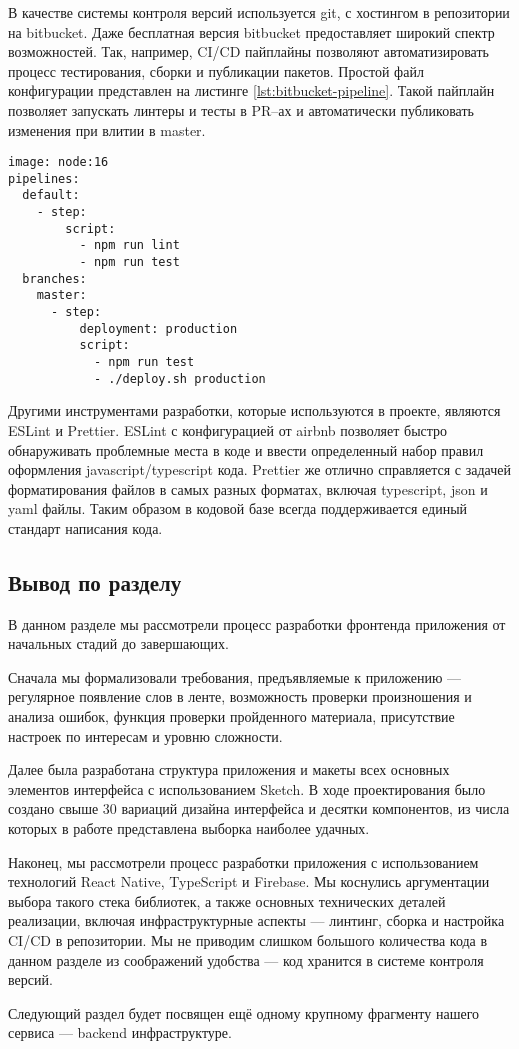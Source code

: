 В качестве системы контроля версий используется git, с хостингом в репозитории на bitbucket. Даже бесплатная версия bitbucket предоставляет широкий спектр возможностей. Так, например, CI/CD пайплайны позволяют автоматизировать процесс тестирования, сборки и публикации пакетов. Простой файл конфигурации представлен на листинге \ref{lst:bitbucket-pipeline}. Такой пайплайн позволяет запускать линтеры и тесты в PR--ах и автоматически публиковать изменения при влитии в master.

\begin{lstlisting}[basicstyle=\fontsize{11}{11}\selectfont,tabsize=4,breaklines=true,caption={Пример конфигурации сборочного конвейера bitbucket.},captionpos=b,label={lst:bitbucket-pipeline}]
image: node:16
pipelines:
  default:
    - step:
        script:
          - npm run lint
          - npm run test
  branches:
    master:
      - step:
          deployment: production
          script:
            - npm run test
            - ./deploy.sh production
\end{lstlisting}

Другими инструментами разработки, которые используются в проекте, являются ESLint и Prettier. ESLint с конфигурацией от airbnb позволяет быстро обнаруживать проблемные места в коде и ввести определенный набор правил оформления javascript/typescript кода. Prettier же отлично справляется с задачей форматирования файлов в самых разных форматах, включая typescript, json и yaml файлы. Таким образом в кодовой базе всегда поддерживается единый стандарт написания кода.

\subsection{Вывод по разделу}
В данном разделе мы рассмотрели процесс разработки фронтенда приложения от начальных стадий до завершающих.

Сначала мы формализовали требования, предъявляемые к приложению --- регулярное появление слов в ленте, возможность проверки произношения и анализа ошибок, функция проверки пройденного материала, присутствие настроек по интересам и уровню сложности.

Далее была разработана структура приложения и макеты всех основных элементов интерфейса с использованием Sketch. В ходе проектирования было создано свыше 30 вариаций дизайна интерфейса и десятки компонентов, из числа которых в работе представлена выборка наиболее удачных.

Наконец, мы рассмотрели процесс разработки приложения с использованием технологий React Native, TypeScript и Firebase. Мы коснулись аргументации выбора такого стека библиотек, а также основных технических деталей реализации, включая инфраструктурные аспекты --- линтинг, сборка и настройка CI/CD в репозитории. Мы не приводим слишком большого количества кода в данном разделе из соображений удобства --- код хранится в системе контроля версий.

Следующий раздел будет посвящен ещё одному крупному фрагменту нашего сервиса --- backend инфраструктуре.